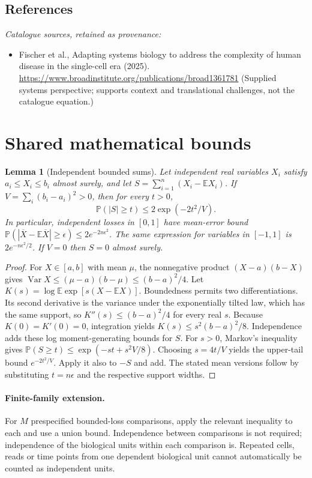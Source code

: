 \documentclass[11pt]{article}
\newcommand{\E}{\mathbb E}
\newcommand{\Prob}{\mathbb P}
\DeclareMathOperator{\Var}{Var}
\providecommand{\E}{\mathbb E}
\providecommand{\Prob}{\mathbb P}
\providecommand{\Var}{\operatorname{Var}}
\newtheorem{sharedlemma}{Lemma}[section]
\begin{document}
\subsection{References}
\noindent\emph{Catalogue sources, retained as provenance:}
\begin{itemize}
\item Fischer et al., Adapting systems biology to address the complexity of human disease in the single-cell era (2025). \url{https://www.broadinstitute.org/publications/broad1361781} (Supplied systems perspective; supports context and translational challenges, not the catalogue equation.)
\end{itemize}
\clearpage


\appendix
\section{Shared mathematical bounds}\label{app:bounds}
\begin{sharedlemma}[Independent bounded sums]\label{lem:bounded}
Let independent real variables $X_i$ satisfy $a_i\leq X_i\leq b_i$ almost surely,
and let $S=\sum_{i=1}^n(X_i-\E X_i)$. If
$V=\sum_i(b_i-a_i)^2>0$, then for every $t>0$,
\[
 \Prob(|S|\geq t)\leq 2\exp(-2t^2/V).
\]
In particular, independent losses in $[0,1]$ have mean-error bound
$\Prob(|\overline X-\E\overline X|\geq\epsilon)
\leq2e^{-2n\epsilon^2}$. The same expression for variables in $[-1,1]$
is $2e^{-n\epsilon^2/2}$. If $V=0$ then $S=0$ almost surely.
\end{sharedlemma}
\begin{proof}
For $X\in[a,b]$ with mean $\mu$, the nonnegative product
$(X-a)(b-X)$ gives
$\Var X\leq(\mu-a)(b-\mu)\leq(b-a)^2/4$.
Let $K(s)=\log\E\exp[s(X-\E X)]$.
Boundedness permits two differentiations. Its second derivative is the variance
under the exponentially tilted law, which has the same support, so
$K''(s)\leq(b-a)^2/4$ for every real $s$.
Because $K(0)=K'(0)=0$, integration yields
$K(s)\leq s^2(b-a)^2/8$.
Independence adds these log moment-generating bounds for $S$.
For $s>0$, Markov's inequality gives
$\Prob(S\geq t)\leq\exp(-st+s^2V/8)$.
Choosing $s=4t/V$ yields the upper-tail bound $e^{-2t^2/V}$.
Apply it also to $-S$ and add. The stated mean versions follow by substituting
$t=n\epsilon$ and the respective support widths.
\end{proof}

\paragraph{Finite-family extension.}
For $M$ prespecified bounded-loss comparisons, apply the relevant inequality to
each and use a union bound. Independence between comparisons is not required;
independence of the biological units within each comparison is. Repeated cells,
reads or time points from one dependent biological unit cannot automatically be
counted as independent units.
\end{document}
